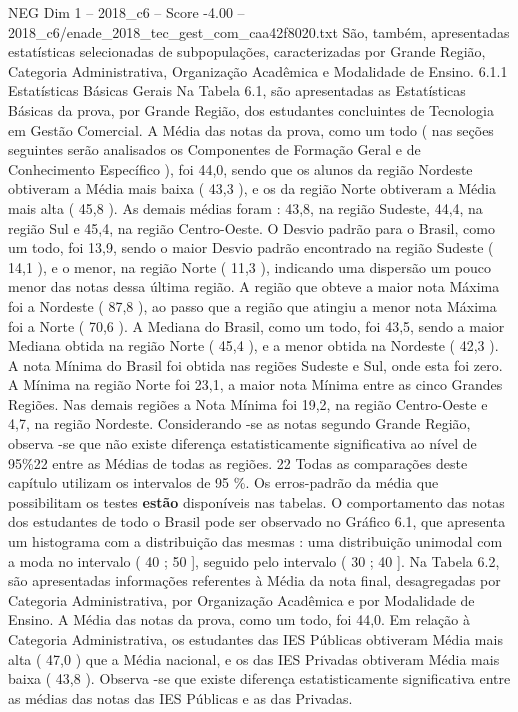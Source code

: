 \begin{textsample}{NEG Dim 1 – 2018\_c6 – Score -4.00 – 2018\_c6/enade\_2018\_tec\_gest\_com\_caa42f8020.txt}
São, também, apresentadas estatísticas selecionadas de subpopulações, caracterizadas por Grande Região, Categoria Administrativa, Organização Acadêmica e Modalidade de Ensino. 6.1.1 Estatísticas Básicas Gerais Na Tabela 6.1, são apresentadas as Estatísticas Básicas da prova, por Grande Região, dos estudantes concluintes de Tecnologia em Gestão Comercial.
A Média das notas da prova, como um todo ( nas seções seguintes serão analisados os Componentes de Formação Geral e de Conhecimento Específico ), foi 44,0, sendo que os alunos da região Nordeste obtiveram a Média mais baixa ( 43,3 ), e os da região Norte obtiveram a Média mais alta ( 45,8 ).
As demais médias foram : 43,8, na região Sudeste, 44,4, na região Sul e 45,4, na região Centro-Oeste.
O Desvio padrão para o Brasil, como um todo, foi 13,9, sendo o maior Desvio padrão encontrado na região Sudeste ( 14,1 ), e o menor, na região Norte ( 11,3 ), indicando uma dispersão um pouco menor das notas dessa última região.
A região que obteve a maior nota Máxima foi a Nordeste ( 87,8 ), ao passo que a região que atingiu a menor nota Máxima foi a Norte ( 70,6 ).
A Mediana do Brasil, como um todo, foi 43,5, sendo a maior Mediana obtida na região Norte ( 45,4 ), e a menor obtida na Nordeste ( 42,3 ).
A nota Mínima do Brasil foi obtida nas regiões Sudeste e Sul, onde esta foi zero.
A Mínima na região Norte foi 23,1, a maior nota Mínima entre as cinco Grandes Regiões.
Nas demais regiões a Nota Mínima foi 19,2, na região Centro-Oeste e 4,7, na região Nordeste.
Considerando -se as notas segundo Grande Região, observa -se que não existe diferença estatisticamente significativa ao nível de 95\%22 entre as Médias de todas as regiões. 22 Todas as comparações deste capítulo utilizam os intervalos de 95 \%.
Os erros-padrão da média que possibilitam os testes \textbf{estão} disponíveis nas tabelas.
O comportamento das notas dos estudantes de todo o Brasil pode ser observado no Gráfico 6.1, que apresenta um histograma com a distribuição das mesmas : uma distribuição unimodal com a moda no intervalo ( 40 ; 50 ], seguido pelo intervalo ( 30 ; 40 ].
Na Tabela 6.2, são apresentadas informações referentes à Média da nota final, desagregadas por Categoria Administrativa, por Organização Acadêmica e por Modalidade de Ensino.
A Média das notas da prova, como um todo, foi 44,0.
Em relação à Categoria Administrativa, os estudantes das IES Públicas obtiveram Média mais alta ( 47,0 ) que a Média nacional, e os das IES Privadas obtiveram Média mais baixa ( 43,8 ).
Observa -se que existe diferença estatisticamente significativa entre as médias das notas das IES Públicas e as das Privadas.

\end{textsample}
